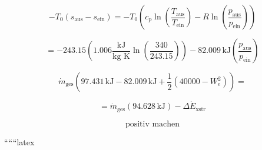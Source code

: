 \[
- T_0 (s_{\text{aus}} - s_{\text{ein}}) = - T_0 \left( c_p \ln \left( \frac{T_{\text{aus}}}{T_{\text{ein}}} \right) - R \ln \left( \frac{p_{\text{aus}}}{p_{\text{ein}}} \right) \right)
\]

\[
= -243.15 \left( 1.006 \frac{\text{kJ}}{\text{kg K}} \ln \left( \frac{340}{243.15} \right) \right) - 82.009 \, \text{kJ} \left( \frac{p_{\text{aus}}}{p_{\text{ein}}} \right)
\]

\[
\dot{m}_{\text{ges}} \left( 97.431 \, \text{kJ} - 82.009 \, \text{kJ} + \frac{1}{2} \left( 40000 - W_{e}^2 \right) \right) =
\]

\[
= \dot{m}_{\text{ges}} \left( \boxed{94.628 \, \text{kJ}} \right) - \Delta \dot{E}_{\text{xstr}}
\]

\[
\text{positiv machen}
\]

``````latex
